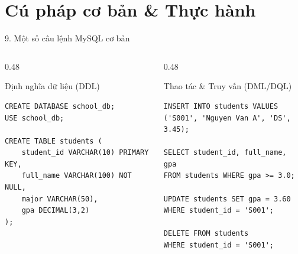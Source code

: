 \documentclass[aspectratio=169,11pt]{beamer}
\begin{document}
\section{Cú pháp cơ bản \& Thực hành}
\begin{frame}[fragile]{9. Một số câu lệnh MySQL cơ bản}
\begin{columns}[t]
  \begin{column}{0.48\textwidth}
    \begin{block}{Định nghĩa dữ liệu (DDL)}
\begin{lstlisting}
CREATE DATABASE school_db;
USE school_db;

CREATE TABLE students (
    student_id VARCHAR(10) PRIMARY KEY,
    full_name VARCHAR(100) NOT NULL,
    major VARCHAR(50),
    gpa DECIMAL(3,2)
);
\end{lstlisting}
    \end{block}
  \end{column}
  \begin{column}{0.48\textwidth}
    \begin{block}{Thao tác \& Truy vấn (DML/DQL)}
\begin{lstlisting}
INSERT INTO students VALUES 
('S001', 'Nguyen Van A', 'DS', 3.45);

SELECT student_id, full_name, gpa
FROM students WHERE gpa >= 3.0;

UPDATE students SET gpa = 3.60 
WHERE student_id = 'S001';

DELETE FROM students 
WHERE student_id = 'S001';
\end{lstlisting}
    \end{block}
  \end{column}
\end{columns}
\end{frame}
\end{document}
